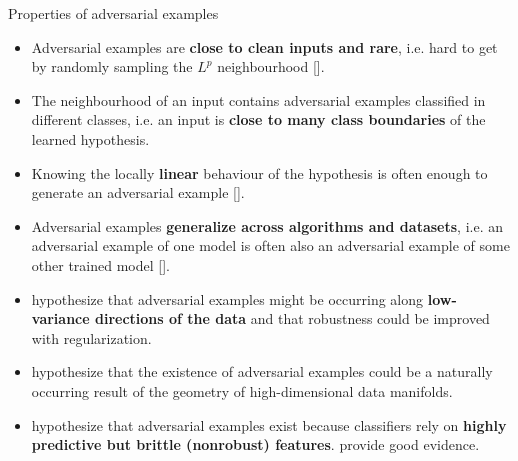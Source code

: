 \documentclass{beamer}
\newcommand{\citet}[1]{{\color{citecolor}\relscale{0.8}\textcite{#1}}}
\newcommand{\citep}[1]{{\color{citecolor}\relscale{0.8}[\textcite{#1}]}}
\begin{document}
\begin{frame}[allowframebreaks=0.9]{Properties of adversarial examples}
\begin{itemize}
	\item Adversarial examples are \textbf{close to clean inputs and rare}, i.e. hard to get by randomly sampling the $L^p$ neighbourhood \citep{Szegedy:2013:IPNN}.    
	\item The neighbourhood of an input contains adversarial examples classified in different classes, i.e. an input is \textbf{close to many class boundaries} of the learned hypothesis.
    \item Knowing the locally \textbf{linear} behaviour of the hypothesis is often enough to generate an adversarial example \citep{Goodfellow:2014:EHAE}.
    \item Adversarial examples \textbf{generalize across algorithms and datasets}, i.e. an adversarial example of one model is often also an adversarial example of some other trained model \citep{Szegedy:2013:IPNN,Papernot:2016:TMLPBBAAS,Liu:2016:DTAEBBA,Tramer:2017:STAE}.
    \item \citet{Tanay:2016:ABTPPAE} hypothesize that adversarial examples might be occurring along \textbf{low-variance directions of the data} and that robustness could be improved with regularization.
    \item \citet{Gilmer:2018:AS} hypothesize that the existence of adversarial examples could be a naturally occurring result of the geometry of high-dimensional data manifolds.
    \item \citet{Tsipras:2018:RMBOA,Ilyas:2019:AENBTF} hypothesize that adversarial examples exist because classifiers rely on \textbf{highly predictive but brittle (nonrobust) features}. \citet{Ilyas:2019:AENBTF} provide good evidence.
\end{itemize}
\end{frame}
\end{document}
